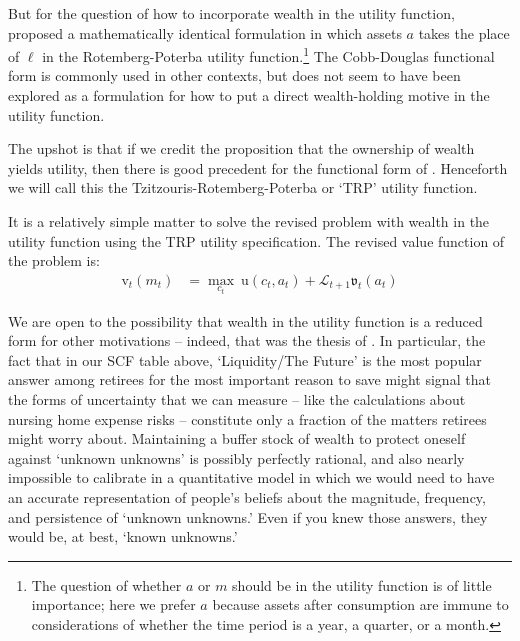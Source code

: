 \documentclass{article}
\newcommand{\uFunc}{\mathrm{u}}
\newcommand{\vFunc}{\mathrm{v}}
\newcommand{\Alive}{\mathcal{L}}
\newcommand{\cNrm}{c}
\newcommand{\aNrm}{a}
\newcommand{\mNrm}{m}
\newcommand{\lqdt}{\ell}
\begin{document}
But for the question of how to incorporate wealth in the utility function, \cite{Tzitzouris2024} proposed a mathematically identical formulation in which assets $\aNrm$ takes the place of $\lqdt$ in the Rotemberg-Poterba utility function.\footnote{The question of whether $\aNrm$ or $\mNrm$ should be in the utility function is of little importance; here we prefer $\aNrm$ because assets after consumption are immune to considerations of whether the time period is a year, a quarter, or a month.}
The Cobb-Douglas functional form is commonly used in other contexts, but does not seem to have been explored as a formulation for how to put a direct wealth-holding motive in the utility function.

The upshot is that if we credit the proposition that the ownership of wealth yields utility, then there is good precedent for the functional form of \cite{Tzitzouris2024}.
Henceforth we will call this the Tzitzouris-Rotemberg-Poterba or `TRP' utility function.


It is a relatively simple matter to solve the revised problem with wealth in the utility function using the TRP utility specification. The revised value function of the problem is:
\begin{align}
    {\vFunc}_{t}({\mNrm}_{t}) & = \max_{\cNrm_{t}} ~ \uFunc(\cNrm_{t}, \aNrm_{t})+\Alive_{t+1}\mathfrak{v}_{t}(a_{t})
\end{align}


We are open to the possibility that wealth in the utility function is a reduced form for other motivations -- indeed, that was the thesis of \cite{WhyDoTheRich}.
In particular, the fact that in our SCF table above, `Liquidity/The Future' is the most popular answer among retirees for the most important reason to save might signal that the forms of uncertainty that we can measure -- like the \cite{Ameriks2020jpe} calculations about nursing home expense risks -- constitute only a fraction of the matters retirees might worry about.
Maintaining a buffer stock of wealth to protect oneself against `unknown unknowns' is possibly perfectly rational, and also nearly impossible to calibrate in a quantitative model in which we would need to have an accurate representation of people's beliefs about the magnitude, frequency, and persistence of `unknown unknowns.'
Even if you knew those answers, they would be, at best, `known unknowns.'
\end{document}

